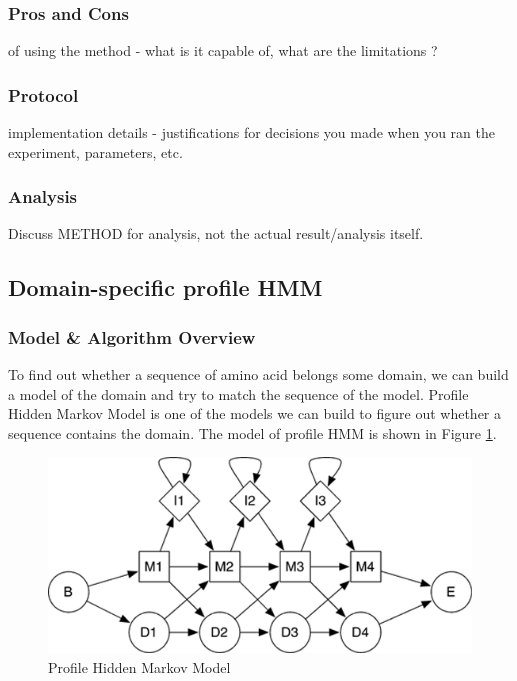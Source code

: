 \documentclass[11pt, oneside]{article}
\begin{document}
\subsubsection{Pros and Cons}
of using the method - what is it capable of, what are the limitations ?


\subsubsection{Protocol}
implementation details - justifications for decisions you made when you ran the experiment, parameters, etc.


\subsubsection{Analysis}
Discuss METHOD for analysis, not the actual result/analysis itself. 

\subsection{Domain-specific profile HMM}

\subsubsection{Model \& Algorithm Overview}
To find out whether a sequence of amino acid belongs some domain, we can build a model of the domain and try to match the sequence of the model. Profile Hidden Markov Model is one of the 
models we can build to figure out whether a sequence contains the domain. The model of profile HMM is shown in Figure \ref{HMM}. 

\begin{figure}[ht]
  \centering
  \includegraphics[scale = 0.7]{images/profileHMM}
      \caption{Profile Hidden Markov Model\cite{hmmer}}
      \label{HMM}
\end{figure}
\end{document}

